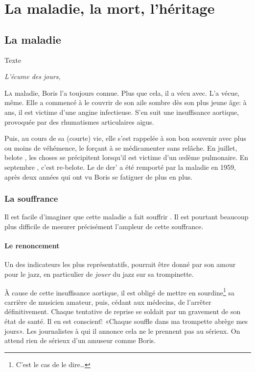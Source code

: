 \chapter{La maladie, la mort, l'héritage}

\section{La maladie}
\epigraph{Texte}
{\emph{L'écume des jours}, \BV}

\lettrine{L}a maladie, Boris l'a toujours connue. Plus que cela, il a vécu avec. L'a vécue, même.
Elle a commencé à le couvrir de son aile sombre dès son plus jeune âge: à  ans, il
est victime d'une angine infectieuse. S'en suit une insuffisance aortique, provoquée 
par des rhumatismes articulaires aigus.

Puis, au cours de sa (courte) vie, elle s'est rappelée à son bon souvenir
avec plus ou moins de véhémence, le forçant à se médicamenter sans relâche. En juillet, belote ,
les choses se précipitent lorsqu'il est victime d'un \oe{}dème pulmonaire.
En septembre , c'est re-belote. Le  de der' a été remporté par la maladie
en 1959, après deux années qui ont vu Boris se fatiguer de plus en plus.

\subsection{La souffrance}
Il est facile d'imaginer que cette maladie a fait souffrir \BV. Il est
pourtant beaucoup plus difficile de mesurer précisément l'ampleur de
cette souffrance.

\subsubsection{Le renoncement}
Un des indicateurs les plus représentatifs, pourrait être donné par son amour
pour le jazz, en particulier de \emph{jouer} du jazz sur sa trompinette.

À cause de cette insuffisance aortique, il est obligé de mettre en sourdine\footnote{C'est le cas
de le dire\ldots} sa carrière de musicien amateur, puis, cédant aux médecins, de l'arrêter
définitivement. Chaque tentative de reprise se soldait par un gravement de son état de santé.
Il en est conscient\~: «Chaque souffle dans ma trompette abrège mes jours». Les journalistes à
qui il annonce cela ne le prennent pas au sérieux. On attend rien de sérieux d'un
amuseur comme Boris.

